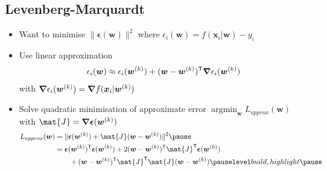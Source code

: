 \begin{slide}
\section[-2]{Levenberg-Marquardt}

\begin{PauseHighLight}
  \begin{itemize}
  \item Want to minimise $\|\bm{\epsilon}(\bm{w})\|^2$ where
    $\epsilon_i(\bm{w}) =  f(\bm{x}_i|\bm{w}) - y_i$\pause
  \item Use linear approximation
    \begin{align*}
      \epsilon_i(\bm{w}) \approx \epsilon_i(\bm{w}^{(k)}) +
      (\bm{w}-\bm{w}^{(k)})^{\textsf{T}} \bm{\nabla} \epsilon_i(\bm{w}^{(k)})
    \end{align*}
    with $\bm{\nabla} \epsilon_i(\bm{w}^{(k)}) = \bm{\nabla} f(\bm{x}_i|\bm{w}^{(k)})$\pause
  \item Solve quadratic minimisation of approximate error
    $\mathop{\mathrm{argmin}}_{\bm{w}} 
    L_{approx}(\bm{w})$ with $\mat{J}=\grad \bm{\epsilon}(\bm{w}^{(k)})$
    \begin{align*}
      L_{approx}(\bm{w}) &= 
      \| \bm{\epsilon}(\bm{w}^{(k)}) +
      \mat{J} (\bm{w}-\bm{w}^{(k)}) \|^2 \pause \\
      &=
      \bm{\epsilon}(\bm{w}^{(k)})^\tr\bm{\epsilon}(\bm{w}^{(k)})
      + 2 (\bm{w}-\bm{w}^{(k)})^\tr \mat{J}^\tr
      \bm{\epsilon}(\bm{w}^{(k)}) \\
      &\hspace{2em}
      + (\bm{w}-\bm{w}^{(k)})^\tr \mat{J}^\tr \mat{J} (\bm{w}-\bm{w}^{(k)})
      \pauseb
    \end{align*}
  \end{itemize}
\end{PauseHighLight}

\end{slide}


